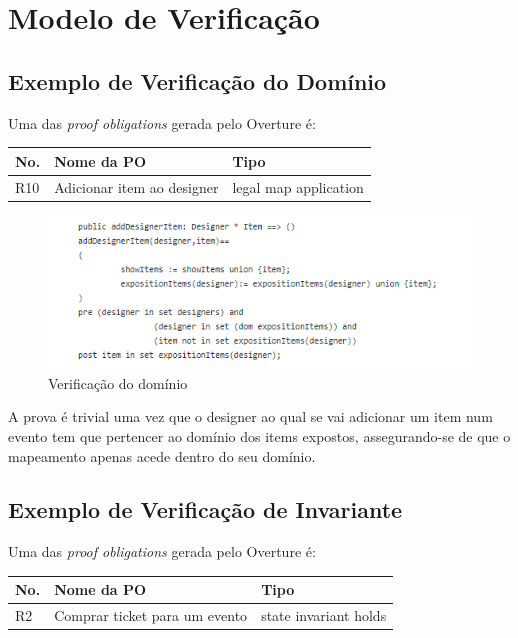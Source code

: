 \documentclass{article}
\begin{document}
\section{Modelo de Verificação}
\subsection{Exemplo de Verificação do Domínio}
Uma das \textit{proof obligations} gerada pelo Overture é:
\begin{center}
\begin{tabular}{ |p{2.5cm}|p{5cm}|p{5cm}| }
\hline
 No. & Nome da PO & Tipo\\
\hline
R10 & Adicionar item ao designer& legal map application\\
\hline
\end{tabular}
\end{center}

\begin{figure}[H]
\centering
\includegraphics{./images/domain.png}
\caption{Verificação do domínio}
\label{fig:method}
\end{figure}
A prova é trivial uma vez que o designer ao qual se vai adicionar um item num evento tem que pertencer ao domínio dos items expostos, assegurando-se de que o mapeamento apenas acede dentro do seu domínio.

\subsection{Exemplo de Verificação de Invariante}
Uma das \textit{proof obligations} gerada pelo Overture é:
\begin{center}
\begin{tabular}{ |p{2.5cm}|p{5cm}|p{5cm}| }
\hline
 No. & Nome da PO & Tipo\\
\hline
R2 & Comprar ticket para um evento& state invariant holds\\
\hline
\end{tabular}
\end{center}
\end{document}
